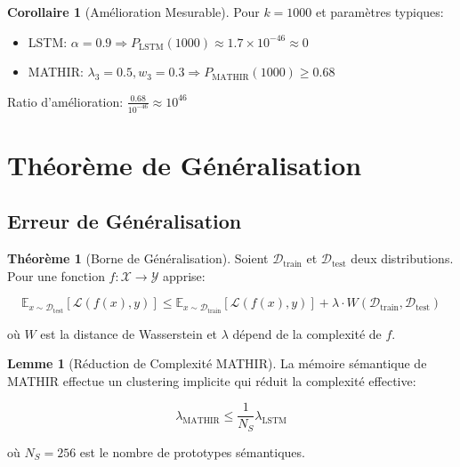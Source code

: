 \documentclass[12pt]{article}
\theoremstyle{definition}
\newtheorem{theorem}{Théorème}
\newtheorem{lemma}{Lemme}
\newtheorem{corollary}{Corollaire}
\begin{document}
\begin{corollary}[Amélioration Mesurable]
Pour $k = 1000$ et paramètres typiques:
\begin{itemize}
\item LSTM: $\alpha = 0.9 \Rightarrow P_{\text{LSTM}}(1000) \approx 1.7 \times 10^{-46} \approx 0$
\item MATHIR: $\lambda_3 = 0.5, w_3 = 0.3 \Rightarrow P_{\text{MATHIR}}(1000) \geq 0.68$
\end{itemize}

Ratio d'amélioration: $\frac{0.68}{10^{-46}} \approx 10^{46}$
\end{corollary}

\section{Théorème de Généralisation}

\subsection{Erreur de Généralisation}

\begin{theorem}[Borne de Généralisation]
Soient $\mathcal{D}_{\text{train}}$ et $\mathcal{D}_{\text{test}}$ deux distributions.
Pour une fonction $f: \mathcal{X} \to \mathcal{Y}$ apprise:

\begin{equation}
\mathbb{E}_{x \sim \mathcal{D}_{\text{test}}}[\mathcal{L}(f(x), y)] \leq 
\mathbb{E}_{x \sim \mathcal{D}_{\text{train}}}[\mathcal{L}(f(x), y)] + 
\lambda \cdot W(\mathcal{D}_{\text{train}}, \mathcal{D}_{\text{test}})
\end{equation}

où $W$ est la distance de Wasserstein et $\lambda$ dépend de la complexité de $f$.
\end{theorem}

\begin{lemma}[Réduction de Complexité MATHIR]
La mémoire sémantique de MATHIR effectue un clustering implicite qui réduit 
la complexité effective:

\begin{equation}
\lambda_{\text{MATHIR}} \leq \frac{1}{N_S} \lambda_{\text{LSTM}}
\end{equation}

où $N_S = 256$ est le nombre de prototypes sémantiques.
\end{lemma}
\end{document}
